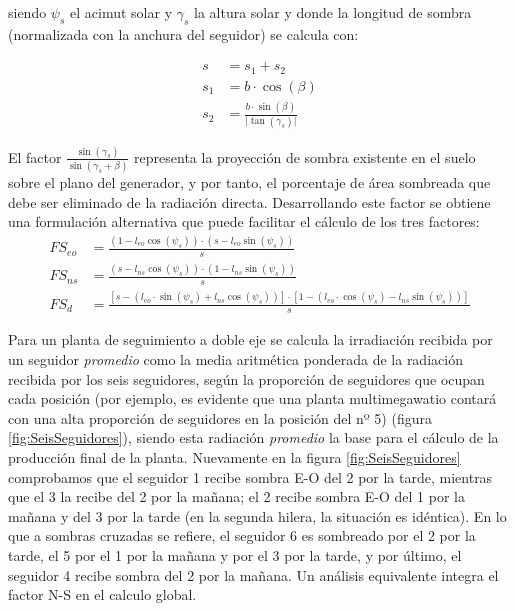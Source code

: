 siendo $\psi_{s}$ el acimut solar y $\gamma_{s}$ la altura solar y
donde la longitud de sombra (normalizada con la anchura del seguidor) se calcula con:

\begin{align}
s & =s_{1}+s_{2}\\
s_{1} & =b\cdot\cos(\beta)\\
s_{2} & =\frac{b\cdot\sin(\beta)}{\vert\tan(\gamma_{s})\vert}
\end{align}

El factor $\frac{\sin(\gamma_{s})}{\sin(\gamma_{s}+\beta)}$ representa 
la proyección de sombra existente en el suelo sobre el plano 
del generador, y por tanto, el porcentaje de área sombreada que 
debe ser eliminado de la radiación directa. Desarrollando este factor 
se obtiene una formulación alternativa que puede facilitar el cálculo de los tres factores:
\begin{align}
FS_{eo} & =\frac{(1-l_{eo}\cos(\psi_{s}))\cdot(s-l_{eo}\sin(\psi_{s}))}{s}\\
FS_{ns} & =\frac{(s-l_{ns}\cos(\psi_{s}))\cdot(1-l_{ns}\sin(\psi_{s}))}{s}\\
FS_{d} & =\frac{\left[s-\left(l_{eo}\cdot\sin(\psi_{s})+l_{ns}\cos(\psi_{s})\right)\right]\cdot\left[1-\left(l_{eo}\cdot\cos(\psi_{s})-l_{ns}\sin(\psi_{s})\right)\right]}{s}
\end{align}

Para un planta de seguimiento a doble eje se calcula la irradiación 
recibida por un seguidor \emph{promedio} como la media aritmética ponderada 
de la radiación recibida por los seis seguidores, según la proporción 
de seguidores que ocupan cada posición 
(por ejemplo, es evidente que una planta multimegawatio contará con
una alta proporción de seguidores en la posición del nº 5) 
(figura \ref{fig:SeisSeguidores}), siendo esta radiación \emph{promedio}
la base para el cálculo de la producción final de la planta. 
Nuevamente en la figura \ref{fig:SeisSeguidores} comprobamos que 
el seguidor 1 recibe sombra E-O del 2 por la tarde, 
mientras que el 3 la recibe del 2 por la mañana; 
el 2 recibe sombra E-O del 1 por la mañana y 
del 3 por la tarde (en la segunda hilera, la situación es idéntica). 
En lo que a sombras cruzadas se refiere, 
el seguidor 6 es sombreado por el 2 por la tarde, 
el 5 por el 1 por la mañana y por el 3 por la tarde, 
y por último, el seguidor 4 recibe sombra del 2 por la mañana. 
Un análisis equivalente integra el factor N-S en el calculo global.

